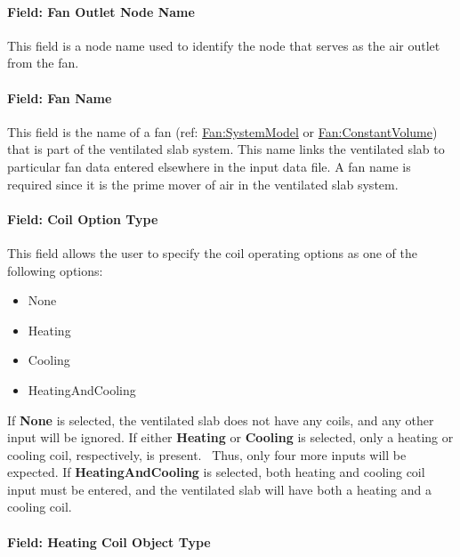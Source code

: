 \paragraph{Field: Fan Outlet Node Name}\label{field-fan-outlet-node-name}

This field is a node name used to identify the node that serves as the air outlet from the fan.

\paragraph{Field: Fan Name}\label{field-fan-name-003}

This field is the name of a fan (ref: \hyperref[fansystemmodel]{Fan:SystemModel} or \hyperref[fanconstantvolume]{Fan:ConstantVolume}) that is part of the ventilated slab system.  This name links the ventilated slab to particular fan data entered elsewhere in the input data file.  A fan name is required since it is the prime mover of air in the ventilated slab system.

\paragraph{Field: Coil Option Type}\label{field-coil-option-type}

This field allows the user to specify the coil operating options as one of the following options:

\begin{itemize}
\item
  None
\item
  Heating
\item
  Cooling
\item
  HeatingAndCooling
\end{itemize}

If \textbf{None} is selected, the ventilated slab does not have any coils, and any other input will be ignored. If either \textbf{Heating} or \textbf{Cooling} is selected, only a heating or cooling coil, respectively, is present.~ Thus, only four more inputs will be expected. If \textbf{HeatingAndCooling} is selected, both heating and cooling coil input must be entered, and the ventilated slab will have both a heating and a cooling coil.

\paragraph{Field: Heating Coil Object Type}\label{field-heating-coil-object-type-001}

